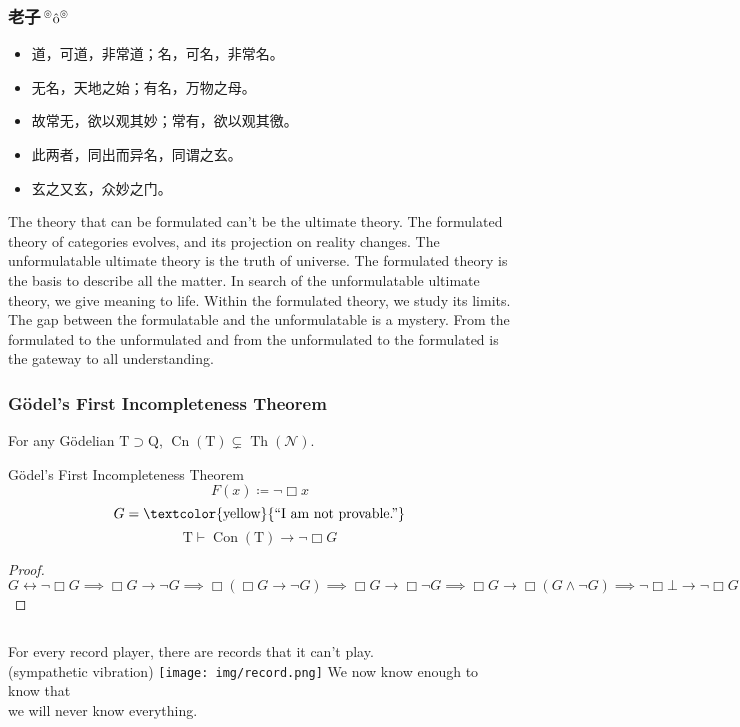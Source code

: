 \documentclass[UTF8,11pt,colorlinks,compress,openany]{beamer}%
\begin{document}
\begin{frame}\frametitle{老子$\sideset{^\circledcirc}{^\circledcirc}{\operatorname{\hat{o}}}$}
\begin{itemize}
	\item 道，可道，非常道；名，可名，非常名。
	\item 无名，天地之始；有名，万物之母。
	\item 故常无，欲以观其妙；常有，欲以观其徼。
	\item 此两者，同出而异名，同谓之玄。
	\item 玄之又玄，众妙之门。
\end{itemize}
\begin{block}{}
	The theory that can be formulated can't be the ultimate theory. The formulated theory of categories evolves, and its projection on reality changes. The unformulatable ultimate theory is the truth of universe. The formulated theory is the basis to describe all the matter. In search of the unformulatable ultimate theory, we give meaning to life. Within the formulated theory, we study its limits. The gap between the formulatable and the unformulatable is a mystery. From the formulated to the unformulated and from the unformulated to the formulated is the gateway to all understanding.
\end{block}
\end{frame}

\begin{frame}\frametitle{G\"odel's First Incompleteness Theorem}
\setlength\abovedisplayskip{0pt}
\setlength\belowdisplayskip{0pt}
	\begin{theorem}
		For any G\"odelian $\mathrm{T}\supset \mathrm{Q}$, $\operatorname{Cn}(\mathrm{T})\subsetneq \operatorname{Th}(\mathcal{N})$.
	\end{theorem}
	\begin{block}{G\"odel's First Incompleteness Theorem}
		\[F(x)\coloneqq \neg\Box x\]
		\[G=\text{\textcolor{yellow}{``I am not provable.''}}\]
		\[\mathrm{T}\vdash\operatorname{Con}(\mathrm{T})\to\neg\Box G\]
	\end{block}
\begin{proof}
$G\leftrightarrow\neg\Box G\implies\Box G\to\neg G\implies\Box(\Box G\to\neg G)\implies\Box G\to\Box\neg G\implies\Box G\to\Box(G\wedge\neg G)\implies\neg\Box\bot\to\neg\Box G$
\end{proof}
\begin{columns}
	{\footnotesize For every record player, there are records that it can't play.\\(sympathetic vibration)}
		\texttt{[image: img/record.png]}
	{\large We now know enough to know that\\ we will never know everything.}
\end{columns}
\end{frame}
\end{document}
